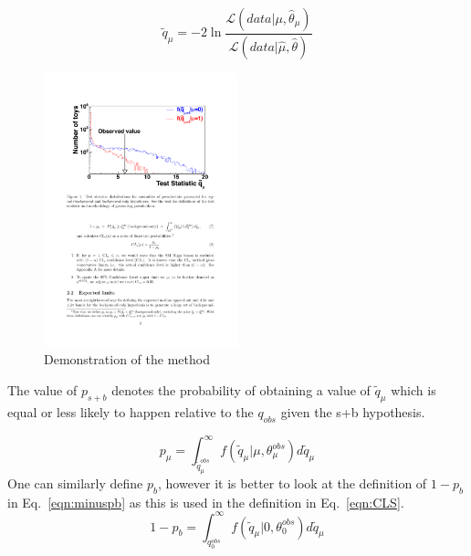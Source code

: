 
\begin{equation}
\tilde{q}_{\mu} = -2\ln\frac{\mathcal{L}\left(data|\mu,\hat{\theta}_{\mu}\right)}{\mathcal{L}\left(data|\hat{\mu},\hat{\theta}\right)}
\label{eqn:testStat}
\end{equation}

\begin{figure}[ht!]
\centering
    \includegraphics[width=0.5\textwidth]{images/Analysis/CLSdemo.pdf}
    \caption{Demonstration of the \CLS method~\cite{CMS-NOTE-2011-005}}
    \label{fig:CLSdemo}
\end{figure}

The value of $p_{s+b}$ denotes the probability of obtaining a value of $\tilde{q}_{\mu}$ which is equal or less likely to happen relative to the $q_{obs}$ given the s+b hypothesis.


\begin{equation}
p_{\mu} = \int_{\tilde{q}_{\mu}^{obs}}^{\infty} f\left(\tilde{q}_{\mu} | \mu, \theta^{obs}_{\mu}   \right) d\tilde{q}_{\mu}
\end{equation}
One can similarly define $p_{b}$, however it is better to look at the definition of $1-p_{b}$ in Eq.~\ref{eqn:minuspb} as this is used in the \CLS definition in Eq.~\ref{eqn:CLS}.
\begin{equation}
1-p_{b} = \int_{q_{0}^{obs}}^{\infty} f\left(\tilde{q}_{\mu} |0, \theta^{obs}_{0}   \right) d\tilde{q}_{\mu}
\label{eqn:minuspb}
\end{equation}

